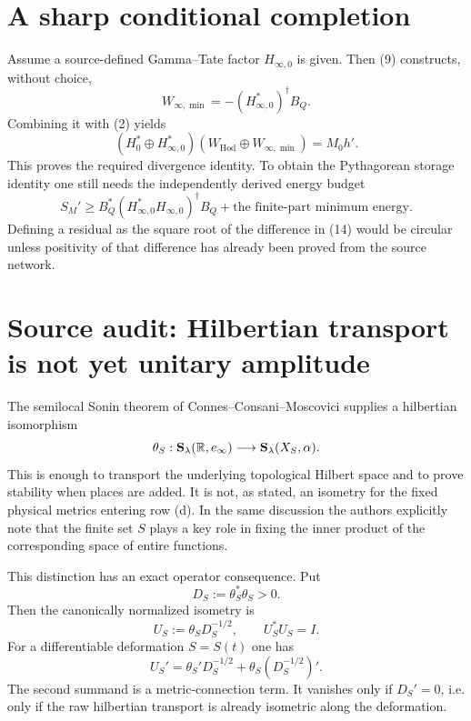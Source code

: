\documentclass[11pt]{article}
\newcommand{\Hod}{\mathrm{Hod}}
\begin{document}
\section{A sharp conditional completion}

Assume a source-defined Gamma--Tate factor $H_{\infty,0}$ is given.  Then (9)
constructs, without choice,
\[
 W_{\infty,\min}=-(H_{\infty,0}^*)^\dagger B_Q .
\]
Combining it with (2) yields
\[
 (H_0^*\oplus H_{\infty,0}^*)
 (W_{\Hod}\oplus W_{\infty,\min})=M_0h'.               \tag{13}
\]
This proves the required divergence identity.  To obtain the Pythagorean
storage identity one still needs the independently derived energy budget
\begin{equation}
 S_M'\ge B_Q^*(H_{\infty,0}^*H_{\infty,0})^\dagger B_Q
       +\text{the finite-part minimum energy}.           \tag{14}
\end{equation}
Defining a residual as the square root of the difference in (14) would be
circular unless positivity of that difference has already been proved from
the source network.

\section{Source audit: Hilbertian transport is not yet unitary amplitude}

The semilocal Sonin theorem of Connes--Consani--Moscovici supplies a
hilbertian isomorphism
\[
 \theta_S:{\bf S}_\lambda(\mathbb R,e_\infty)
 \longrightarrow {\bf S}_\lambda(X_S,\alpha).
\]
This is enough to transport the underlying topological Hilbert space and to
prove stability when places are added.  It is not, as stated, an isometry for
the fixed physical metrics entering row (d).  In the same discussion the
authors explicitly note that the finite set $S$ plays a key role in fixing the
inner product of the corresponding space of entire functions.

This distinction has an exact operator consequence.  Put
\begin{equation}
 D_S:=\theta_S^*\theta_S>0.                               \tag{15}
\end{equation}
Then the canonically normalized isometry is
\begin{equation}
 U_S:=\theta_SD_S^{-1/2},\qquad U_S^*U_S=I.              \tag{16}
\end{equation}
For a differentiable deformation $S=S(t)$ one has
\begin{equation}
 U_S'=\theta_S'D_S^{-1/2}
       +\theta_S(D_S^{-1/2})'.                           \tag{17}
\end{equation}
The second summand is a metric-connection term.  It vanishes only if
$D_S'=0$, i.e. only if the raw hilbertian transport is already isometric along
the deformation.
\end{document}
